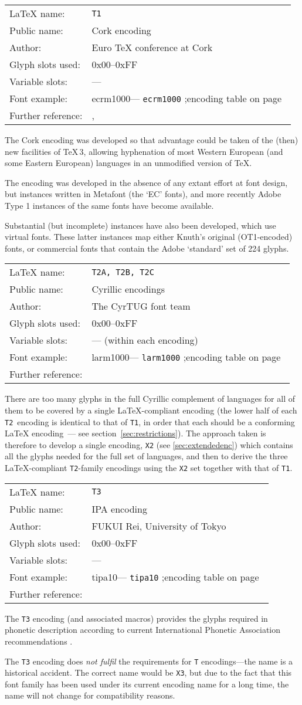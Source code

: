 \documentclass{ltxguide}[1994/11/20]
\makeatletter
\providecommand{\Enc}[1]{\texttt{#1}}
\newenvironment{encodinginfo}[7]%
  {\noindent
   \begin{tabularx}{\linewidth}{@{}l>{\raggedright\let\\\tabularnewline}X}%
     \LaTeX{} name:          & \texttt{#1}\\%
     Public name:          & #2\\%
     Author:                   & #3\\%
     Glyph slots used: & #4\\%
     Variable slots:     & #5\\%
     Font example:     & \def\@tempa{#6}\ifx\@tempa\@empty---%
                            \else\texttt{#6}\referenceftable{#6}\fi\\%
     Further reference:                & #7%
   \end{tabularx}%
   \par\nobreak
   \vspace*{3pt}%
   \quote
  }%
  {\endquote
   \vspace{6pt}}
\def\referenceftable#1{
  \@ifundefined{r@fonttable:#1}%
  \relax
  {;\space encoding table on page~\pageref{fonttable:#1}}%
}
\makeatother
\begin{document}
\begin{encodinginfo}{T1}
        {Cork encoding}
        {Euro \TeX{} conference at Cork}
        {0x00--0xFF}
        {---}
        {ecrm1000}
        {\cite[p.514]{tub:MFe90}, \cite[p.99]{Knappen:TB17-2-96}}

  The Cork encoding was developed so that advantage could be taken of
  the (then) new facilities of \TeX{}\,3, allowing hyphenation of
  most Western European (and some Eastern European) languages in an
  unmodified version of \TeX{}.

  The encoding was developed in the absence of any extant effort at
  font design, but instances written in Metafont (the `EC' fonts), and
  more recently Adobe Type 1 instances of the same fonts have become
  available.

  Substantial (but incomplete) instances have also been developed,
  which use virtual fonts.  These latter instances map either Knuth's
  original (OT1-encoded) fonts, or commercial fonts that contain the
  Adobe `standard' set of 224 glyphs.
\end{encodinginfo}

\begin{encodinginfo}
  {T2A, T2B, T2C}
  {Cyrillic encodings}
  {The CyrTUG font team}
  {0x00--0xFF}
  {--- (within each encoding)}
  {larm1000}
  {\cite{Berdnikov:eurotex-98}}

  There are too many glyphs in the full Cyrillic complement of
  languages for all of them to be covered by a single
  \LaTeX{}-compliant encoding (the lower half of each
  \Enc{T2}~encoding is identical to that of \Enc{T1}, in order that
  each should be a conforming \LaTeX{} encoding~--- see
  section~\ref{sec:restrictions}).  The approach taken is
  therefore to develop a single encoding, \Enc{X2} (see \ref{sec:extendedenc})
  which contains all the glyphs needed for the full set of
  languages, and then to derive the three \LaTeX{}-compliant
  \Enc{T2}-family encodings using the \Enc{X2} set together with that of
  \Enc{T1}.

\end{encodinginfo}



\begin{encodinginfo}{T3}
        {IPA encoding}
        {FUKUI Rei, University of Tokyo}
        {0x00--0xFF}
        {---}
        {tipa10}
        {\cite[p.102]{Rei:TB17-2-102}}


    The \Enc{T3} encoding (and associated macros) provides the glyphs required
  in phonetic description according to current International Phonetic
  Association recommendations \cite{ipa}.

  The \Enc{T3} encoding does \emph{not fulfil} the requirements for \Enc{T}
  encodings---the name is a historical accident. The correct name would be
  \Enc{X3}, but due to the fact that this font family has been used under its
  current encoding name for a long time, the name will not change for
  compatibility reasons.

\end{encodinginfo}
\end{document}
